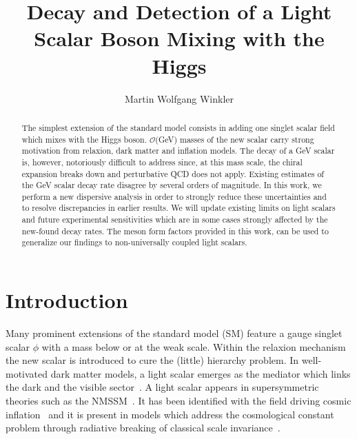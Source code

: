 \documentclass[preprintnumbers,twocolumn,aps,floats,nofootinbib]{revtex4-1}
\begin{document}
\title{Decay and Detection of a Light Scalar Boson Mixing with the Higgs}
\author{Martin Wolfgang Winkler}
\begin{abstract}
The simplest extension of the standard model consists in adding one singlet scalar field which mixes with the Higgs boson. $\mathcal{O}$(GeV) masses of the new scalar carry strong motivation from relaxion, dark matter and inflation models. The decay of a GeV scalar is, however, notoriously difficult to address since, at this mass scale, the chiral expansion breaks down and perturbative QCD does not apply. Existing estimates of the GeV scalar decay rate disagree by several orders of magnitude. In this work, we perform a new dispersive analysis in order to strongly reduce these uncertainties and to resolve discrepancies in earlier results. We will update existing limits on light scalars and future experimental sensitivities which are in some cases strongly affected by the new-found decay rates. The meson form factors provided in this work, can be used to generalize our findings to non-universally coupled light scalars.
\end{abstract}
\maketitle

\section{Introduction}
Many prominent extensions of the standard model (SM) feature a gauge singlet scalar $\phi$ with a mass below or at the weak scale.
Within the relaxion mechanism~\cite{Graham:2015cka} the new scalar is introduced to cure the (little) hierarchy problem. In well-motivated dark matter models, a light scalar emerges as the mediator which links the dark and the visible sector~\cite{Pospelov:2007mp}. A light scalar appears in supersymmetric theories such as the NMSSM~\cite{Fayet:1974pd}.
It has been identified with the field driving cosmic inflation~\cite{Shaposhnikov:2006xi,Bezrukov:2009yw} and it is present in models which address the cosmological constant problem through radiative breaking of classical scale invariance~\cite{Foot:2011et}.
\end{document}

